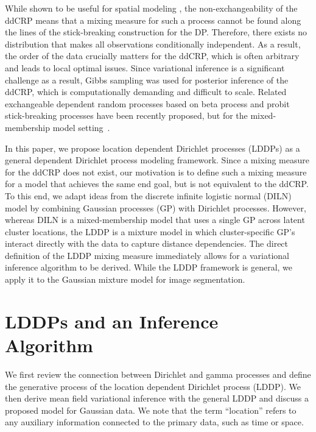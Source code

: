 \documentclass[runningheads,a4paper]{iscide}
\begin{document}
While shown to be useful for spatial modeling \cite{Ghosh:2011}, the non-exchangeability of the ddCRP means that a mixing measure for such a process cannot be found along the lines of the stick-breaking construction for the DP. Therefore, there exists no distribution that makes all observations conditionally independent. As a result, the order of the data crucially matters for the ddCRP, which is often arbitrary and leads to local optimal issues. Since variational inference is a significant challenge as a result, Gibbs sampling was used for posterior inference of the ddCRP, which is computationally demanding and difficult to scale. Related exchangeable dependent random processes
based on beta process and probit stick-breaking processes have been recently
proposed, but for the mixed-membership model setting~\cite{Ren11KBP,Rod11NB}.

In this paper, we propose location dependent Dirichlet processes
(LDDPs) as a general dependent Dirichlet process modeling framework. Since a mixing measure for the ddCRP does not exist, our motivation is to define such a mixing measure for a model that achieves the same end goal, but is not equivalent to the ddCRP. To this end, we adapt ideas from the discrete infinite logistic normal (DILN) model \cite{Paisley12DILN} by combining Gaussian processes (GP) with Dirichlet processes. However, whereas DILN is a mixed-membership model that uses a single GP across latent cluster locations, the LDDP is a mixture model in which cluster-specific GP's interact directly with the data to capture distance dependencies. The direct definition of the LDDP mixing measure immediately allows for a variational inference algorithm to be derived. While the LDDP framework is general, we apply it to the Gaussian mixture model for image segmentation.


\section{LDDPs and an Inference Algorithm}
We first review the connection between Dirichlet and gamma processes and define the generative process of the location dependent Dirichlet process (LDDP). We then derive mean field variational inference with
the general LDDP and discuss a
proposed model for Gaussian data. We note that the term ``location'' refers to any auxiliary
information connected to the primary data, such as time or space.
\end{document}
